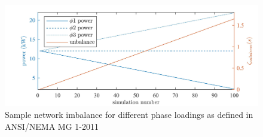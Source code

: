 \begin{figure}\centering
	\includegraphics{_chapter1/fig/power-unbalance}
	\caption{Sample network imbalance for different phase loadings as defined in ANSI/NEMA MG 1-2011}
	\label{ch1:fig:power-unbalance}
\end{figure}